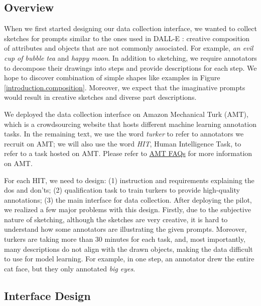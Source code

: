 \subsection{Overview}
When we first started designing our data collection interface, we wanted to collect sketches for prompts similar to the ones used in DALL-E \citep{dallePaper}: creative composition of attributes and objects that are not commonly associated. 
For example, \textit{an evil cup of bubble tea} and \textit{happy moon}. 
In addition to sketching, we require annotators to decompose their drawings into steps and provide descriptions for each step. We hope to discover combination of simple shapes like examples in Figure \ref{introduction.composition}. Moreover, we expect that the imaginative prompts would result in creative sketches and diverse part descriptions.   

We deployed the data collection interface on Amazon Mechanical Turk (AMT), which is a crowdsourcing website that hosts different machine learning annotation tasks. In the remaining text, we use the word \textit{turker} to refer to annotators we recruit on AMT; we will also use the word \textit{HIT}, Human Intelligence Task, to refer to a task hosted on AMT. Please refer to \href{https://www.mturk.com/worker/help#:~:text=A%20Human%20Intelligence%20Task%2C%20or,be%20completed%20by%20Worker%20customers.}{AMT FAQs} for more information on AMT. 
 
For each HIT, we need to design: (1) instruction and requirements explaining the dos and don'ts; (2) qualification task to train turkers to provide high-quality annotations; (3) the main interface for data collection. 
After deploying the pilot, we realized a few major problems with this design. Firstly, due to the subjective nature of sketching, although the sketches are very creative, it is hard to understand how some annotators are illustrating the given prompts. Moreover, turkers are taking more than 30 minutes for each task, and, most importantly, many descriptions do not align with the drawn objects, making the data difficult to use for model learning. For example, in one step, an annotator drew the entire cat face, but they only annotated \textit{big eyes}.      

\subsection{Interface Design}

